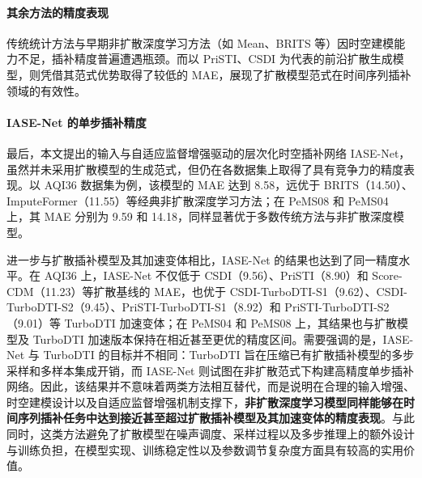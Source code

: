 \paragraph{其余方法的精度表现}
传统统计方法与早期非扩散深度学习方法（如 Mean、BRITS 等）因时空建模能力不足，插补精度普遍遭遇瓶颈。而以 PriSTI、CSDI 为代表的前沿扩散生成模型，则凭借其范式优势取得了较低的 MAE，展现了扩散模型范式在时间序列插补领域的有效性。



\paragraph{IASE-Net 的单步插补精度}
最后，本文提出的输入与自适应监督增强驱动的层次化时空插补网络 IASE-Net，虽然并未采用扩散模型的生成范式，但仍在各数据集上取得了具有竞争力的精度表现。以 \textsf{AQI36} 数据集为例，该模型的 MAE 达到 8.58，远优于 BRITS（14.50）、ImputeFormer（11.55）等经典非扩散深度学习方法；在 \textsf{PeMS08} 和 \textsf{PeMS04} 上，其 MAE 分别为 9.59 和 14.18，同样显著优于多数传统方法与非扩散深度模型。

进一步与扩散插补模型及其加速变体相比，IASE-Net 的结果也达到了同一精度水平。在 \textsf{AQI36} 上，IASE-Net 不仅低于 CSDI（9.56）、PriSTI（8.90）和 Score-CDM（11.23）等扩散基线的 MAE，也优于 CSDI-TurboDTI-S1（9.62）、CSDI-TurboDTI-S2（9.45）、PriSTI-TurboDTI-S1（8.92）和 PriSTI-TurboDTI-S2（9.01）等 TurboDTI 加速变体；在 \textsf{PeMS04} 和 \textsf{PeMS08} 上，其结果也与扩散模型及 TurboDTI 加速版本保持在相近甚至更优的精度区间。需要强调的是，IASE-Net 与 TurboDTI 的目标并不相同：TurboDTI 旨在压缩已有扩散插补模型的多步采样和多样本集成开销，而 IASE-Net 则试图在非扩散范式下构建高精度单步插补网络。因此，该结果并不意味着两类方法相互替代，而是说明在合理的输入增强、时空建模设计以及自适应监督增强机制支撑下，\textbf{非扩散深度学习模型同样能够在时间序列插补任务中达到接近甚至超过扩散插补模型及其加速变体的精度表现}。与此同时，这类方法避免了扩散模型在噪声调度、采样过程以及多步推理上的额外设计与训练负担，在模型实现、训练稳定性以及参数调节复杂度方面具有较高的实用价值。

